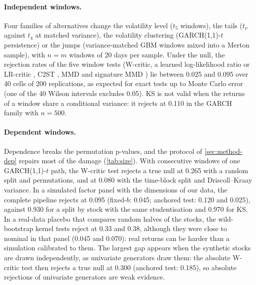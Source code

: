 \documentclass[11pt,a4paper]{article}
\theoremstyle{plain}
\newcommand{\WC}{W-critic}
\newcommand{\GARCHt}{GARCH(1,1)-$t$}
\begin{document}
\paragraph{Independent windows.} Four families of alternatives change the volatility level ($t_5$
windows), the tails ($t_\nu$ against $t_4$ at matched variance), the volatility clustering
(\GARCHt{} persistence) or the jumps (variance-matched GBM windows mixed into a Merton sample), with
$n=m$ windows of 20 days per sample. Under the null, the rejection rates of the five window tests
(\WC{}, a learned log-likelihood ratio or LR-critic \citep{cheng2022classification}, C2ST
\citep{lopezpaz2017revisiting}, MMD \citep{gretton2012kernel} and signature MMD
\citep{chevyrev2022signature}) lie between 0.025 and 0.095 over 40 cells of 200 replications, as
expected for exact tests up to Monte Carlo error (one of the 40 Wilson intervals excludes 0.05). KS
is not valid when the returns of a window share a conditional variance: it rejects at 0.110 in the
GARCH family with $n=500$.

\paragraph{Dependent windows.} Dependence breaks the permutation p-values, and the protocol of
\cref{sec:method-dep} repairs most of the damage (\cref{tab:size}). With consecutive windows of one
\GARCHt{} path, the \WC{} test rejects a true null at 0.265 with a random split and permutations,
and at 0.080 with the time-block split and Driscoll--Kraay variance. In a simulated factor panel
with the dimensions of our data, the complete pipeline rejects at 0.095 (fixed-$b$: 0.045; anchored
test: 0.120 and 0.025), against 0.930 for a split by stock with the same studentisation and 0.970
for KS. In a real-data placebo that compares random halves of the stocks, the wild-bootstrap kernel
tests reject at 0.33 and 0.38, although they were close to nominal in that panel (0.045 and 0.070):
real returns can be harder than a simulation calibrated to them. The largest gap appears when the
synthetic stocks are drawn independently, as univariate generators draw them: the absolute \WC{}
test then rejects a true null at 0.300 (anchored test: 0.185), so absolute rejections of univariate
generators are weak evidence.
\end{document}
